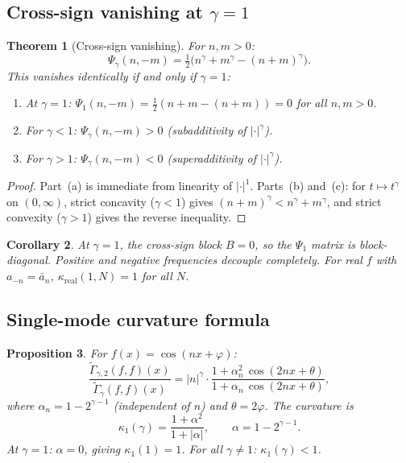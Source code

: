 \documentclass[11pt,a4paper]{article}
\theoremstyle{plain}
\newtheorem{theorem}{Theorem}[section]
\newtheorem{proposition}[theorem]{Proposition}
\newtheorem{corollary}[theorem]{Corollary}
\theoremstyle{definition}
\theoremstyle{remark}
\begin{document}
\subsection{Cross-sign vanishing at $\gamma = 1$}\label{sec:cross-sign}

\begin{theorem}[Cross-sign vanishing]\label{thm:cross-sign}
For $n,m > 0$:
\begin{equation}\label{eq:cross-sign}
  \Psi_\gamma(n,-m) = \tfrac{1}{2}\bigl(n^\gamma + m^\gamma
  - (n+m)^\gamma\bigr).
\end{equation}
This vanishes identically if and only if $\gamma = 1$:
\begin{enumerate}[label=(\alph*)]
\item At $\gamma = 1$: $\Psi_1(n,-m)
  = \tfrac{1}{2}(n + m - (n+m)) = 0$ for all $n,m > 0$.
\item For $\gamma < 1$: $\Psi_\gamma(n,-m) > 0$
  (subadditivity of $|\cdot|^\gamma$).
\item For $\gamma > 1$: $\Psi_\gamma(n,-m) < 0$
  (superadditivity of $|\cdot|^\gamma$).
\end{enumerate}
\end{theorem}

\begin{proof}
Part~(a) is immediate from linearity of $|\cdot|^1$.
Parts~(b) and~(c): for $t \mapsto t^\gamma$ on $(0,\infty)$,
strict concavity ($\gamma < 1$) gives
$(n+m)^\gamma < n^\gamma + m^\gamma$, and strict convexity
($\gamma > 1$) gives the reverse inequality.
\end{proof}

\begin{corollary}\label{cor:block-diag}
At $\gamma = 1$, the cross-sign block $B = 0$, so the $\Psi_1$
matrix is block-diagonal. Positive and negative frequencies
decouple completely. For real $f$ with $a_{-n} = \bar{a}_n$,
$\kappa_{\mathrm{real}}(1,N) = 1$ for all $N$.
\end{corollary}


\subsection{Single-mode curvature formula}

\begin{proposition}\label{prop:single-mode}
For $f(x) = \cos(nx + \varphi)$:
\begin{equation}\label{eq:single-mode}
  \frac{\widetilde{\Gamma}_{\gamma,2}(f,f)(x)}
       {\widetilde{\Gamma}_\gamma(f,f)(x)}
  = |n|^\gamma \cdot
  \frac{1 + \alpha_n^2\,\cos(2nx+\theta)}
       {1 + \alpha_n\,\cos(2nx+\theta)},
\end{equation}
where $\alpha_n = 1 - 2^{\gamma-1}$ (independent of $n$)
and $\theta = 2\varphi$. The curvature is
\begin{equation}\label{eq:kappa1}
  \kappa_1(\gamma) = \frac{1 + \alpha^2}{1 + |\alpha|},
  \qquad \alpha = 1 - 2^{\gamma-1}.
\end{equation}
At $\gamma = 1$: $\alpha = 0$, giving $\kappa_1(1) = 1$.
For all $\gamma \neq 1$: $\kappa_1(\gamma) < 1$.
\end{proposition}
\end{document}
